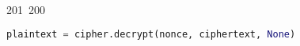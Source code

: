 201~200~\documentclass{article}
\begin{document}
\begin{lstlisting}[language=Python, caption=Decrypting a Message with ChaCha20-Poly1305]
	                                                                                                                                                                                                                                                                                                	                                                                                                                                        	    	                                                                                                	                                                                                                                                                                                                                                                                                                                                	                                                                        	                                                                        	                                                                                                                                        	                                                                                                                                                                                                                        	                                                                                                                            	                                                                	                                                                                                                                                                                plaintext = cipher.decrypt(nonce, ciphertext, None)

\end{lstlisting}
\end{document}
